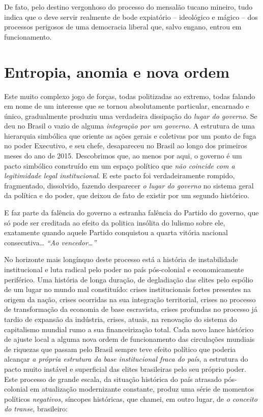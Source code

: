 De fato, pelo destino vergonhoso do processo do mensalão tucano mineiro,
tudo indica que o  deve servir realmente de bode expiatório --
ideológico e mágico -- dos processos perigosos de uma democracia liberal
que, salvo engano, entrou em funcionamento.

  \section{Entropia, anomia e nova
  ordem}\label{entropia-anomia-e-nova-ordem}

Este muito complexo jogo de forças, todas politizadas ao extremo, todas
falando em nome de um interesse que se tornou absolutamente particular,
encarnado e único, gradualmente produziu uma verdadeira dissipação do
\emph{lugar do governo}. Se deu no Brasil o vazio de alguma
\emph{integração por um governo}. A estrutura de uma hierarquia
simbólica que oriente as ações gerais e coletivas por um ponto de fuga
no poder Executivo, e seu chefe, desapareceu no Brasil ao longo dos
primeiros meses do ano de 2015. Descobrimos que, ao menos por aqui, o
governo é um pacto simbólico construído em um espaço político que
\emph{não coincide com a legitimidade legal institucional}. E este pacto
foi verdadeiramente rompido, fragmentado, dissolvido, fazendo desparecer
\emph{o lugar do governo} no sistema geral da política e do poder, que
deixou de fato de existir por um segundo histórico.

E faz parte da falência do governo a estranha falência do Partido do
governo, que só pode ser creditada ao efeito da politica insólita do
lulismo sobre ele, exatamente quando aquele Partido conquistou a quarta
vitória nacional consecutiva… \emph{``Ao vencedor…''}

No horizonte mais longínquo deste processo está a história de
instabilidade institucional e luta radical pelo poder no país
pós-colonial e economicamente periférico. Uma história de longa duração,
de degladiação das elites pelo espólio de um lugar no mundo mal
constituído: crises institucionais fortes presentes na origem da nação,
crises ocorridas na sua integração territorial, crises no processo de
transformação da economia de base escravista, crises profundas no
processo já tardio de expansão da indústria, crises, atuais, na
renovação do sistema do capitalismo mundial rumo a sua financeirização
total. Cada novo lance histórico de ajuste local a alguma nova ordem de
funcionamento das circulações mundiais de riquezas que passam pelo
Brasil sempre teve efeito político que poderia alcançar \emph{a própria
estrutura da base institucional fraca do país}, a estrutura do pacto
muito instável e superficial das elites brasileiras pelo seu próprio
poder. Este processo de grande escala, da situação histórica do país
atrasado pós-colonial em atualização modernizante constante, produz uma
série de momentos políticos \emph{negativos,} síncopes históricas, que
chamei, em outro lugar, de \emph{o conceito do transe}, brasileiro:

